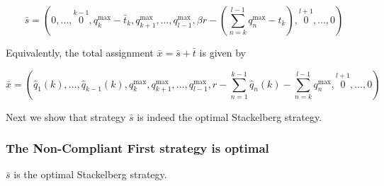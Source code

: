 \[
\bar{s} = \left(0, \dots, \stackrel{k-1}{0}, 
q_{k}^{\max} - \bar{t}_{k}, 
q_{k+1}^{\max}, \dots,  q_{l-1}^{\max}, 
\beta r - (\sum_{n = k}^{l-1}q^{\max}_n - t_{k}), 
\stackrel{l+1}{0}, \dots, 0 \right)
\]

Equivalently, the total assignment $\bar{x} = \bar{s} + \bar{t}$ is given by

\[
\bar{x} = \left(
\hat{q}_1(k), \dots, \hat{q}_{k - 1}(k), 
q_{k}^{\max}, 
q_{k+1}^{\max}, \dots,  q_{l-1}^{\max}, 
r - \sum_{n = 1}^{k-1}\hat{q}_n(k) - \sum_{n = k}^{l-1}q_n^{\max}, 
\stackrel{l+1}{0}, \dots, 0 \right)
\]

Next we show that strategy $\bar{s}$ is indeed the optimal Stackelberg strategy.


\subsubsection{The Non-Compliant First strategy is optimal}

\begin{theorem}
$\bar{s}$ is the optimal Stackelberg strategy.
\end{theorem}


